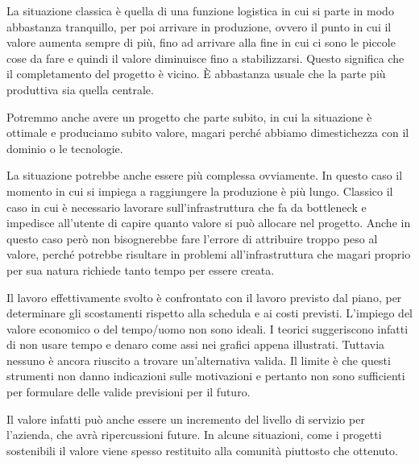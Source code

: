 \noindent La situazione classica è quella di una funzione logistica in cui si parte in modo abbastanza tranquillo, per poi arrivare in produzione, ovvero il punto in cui il valore aumenta sempre di più, fino ad arrivare alla fine in cui ci sono le piccole cose da fare e quindi il valore diminuisce fino a stabilizzarsi. Questo significa che il completamento del progetto è vicino. È abbastanza usuale che la parte più produttiva sia quella centrale.


\noindent Potremmo anche avere un progetto che parte subito, in cui la situazione è ottimale e produciamo subito valore, magari perché abbiamo dimestichezza con il dominio o le tecnologie.


\noindent La situazione potrebbe anche essere più complessa ovviamente. In questo caso il momento in cui si impiega a raggiungere la produzione è più lungo. Classico il caso in cui è necessario lavorare sull'infrastruttura che fa da bottleneck e impedisce all'utente di capire quanto valore si può allocare nel progetto. Anche in questo caso però non bisognerebbe fare l'errore di attribuire troppo peso al valore, perché potrebbe risultare in problemi all'infrastruttura che magari proprio per sua natura richiede tanto tempo per essere creata.


\noindent Il lavoro effettivamente svolto è confrontato con il lavoro previsto dal piano, per determinare gli scostamenti rispetto alla schedula e ai costi previsti.\newline
L’impiego del valore economico o del tempo/uomo non sono ideali. I teorici suggeriscono infatti di non usare tempo e denaro come assi nei grafici appena illustrati. Tuttavia nessuno è ancora riuscito a trovare un'alternativa valida.\newline
Il limite è che questi strumenti non danno indicazioni sulle motivazioni e pertanto non sono sufficienti per formulare delle valide previsioni per il futuro.

\noindent Il valore infatti può anche essere un incremento del livello di servizio per l'azienda, che avrà ripercussioni future. In alcune situazioni, come i progetti sostenibili il valore viene spesso restituito alla comunità piuttosto che ottenuto.

